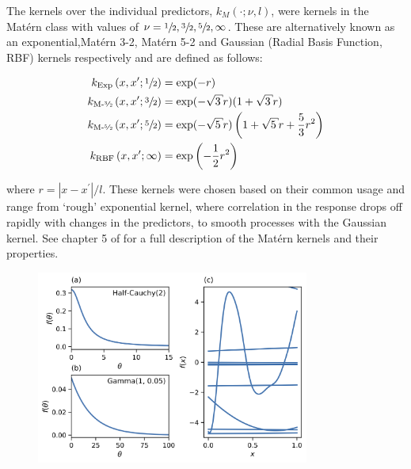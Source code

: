 The kernels over the individual predictors, $k_{M}(\cdot; \nu, l)$, were kernels in the Mat\'{e}rn class with values of $\nu=\sfrac{1}{2},\sfrac{3}{2},\sfrac{5}{2},\infty$. These are alternatively known as an exponential,Mat\'{e}rn 3-2, Mat\'{e}rn 5-2 and  Gaussian (Radial Basis Function, RBF) kernels respectively and are defined as follows: 

\begin{align}
k_{\text{Exp}}\left(x, x^{\prime}; \sfrac{1}{2}\right) &=\exp (-r) \label{eqn:kern_exp}\\
k_{\text{M-\sfrac{3}{2}}}\left(x, x^{\prime}; \sfrac{3}{2}\right) &= \exp (-\sqrt{3} r)(1+\sqrt{3} r) \label{eqn:kern_m32} \\
k_{\text{M-\sfrac{5}{2}}}\left(x, x^{\prime}; \sfrac{5}{2}\right) &= \exp (-\sqrt{5} r)\left(1+\sqrt{5} r+\frac{5}{3} r^{2}\right) \label{eqn:kern_m52}\\
k_{\text{RBF}}\left(x, x^{\prime}; \infty\right) &= \exp \left(-\frac{1}{2} r^{2}\right) \label{eqn:kern_gauss}
\end{align}

where $r = |x-x^{\prime}|/l$. These kernels were chosen based on their common usage \cite{shahriariTakingHumanOut2016} and  range from `rough' exponential kernel, where correlation in the response drops off rapidly with changes in the predictors, to smooth processes with the Gaussian kernel. See chapter 5 of \cite{rasmussenGaussianProcessesMachine2006} for a full description of the Mat\'{e}rn kernels and their properties.  

\begin{figure}
    \centering
    \includegraphics[width=0.8\textwidth]{chapters/msm_optimization/figures/prior_functions.png}
    \label{fig:priors}
\end{figure}

